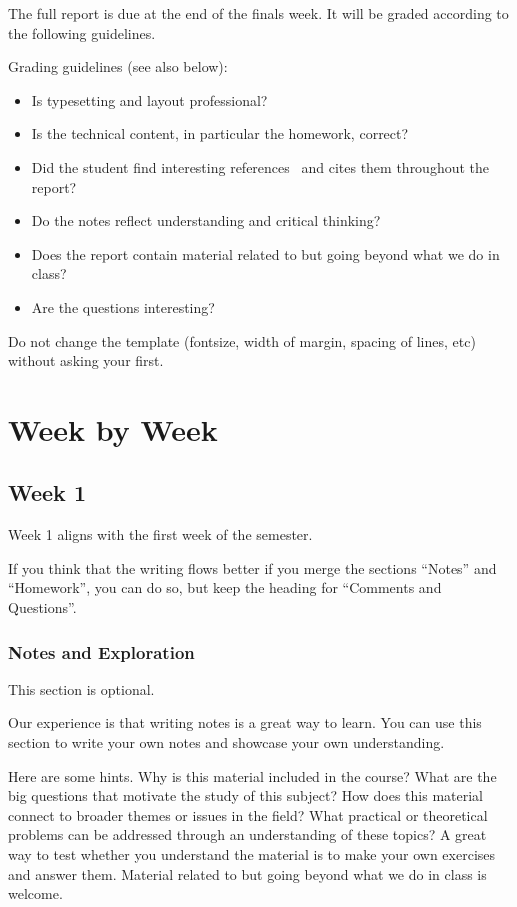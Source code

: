 \documentclass{article}
\theoremstyle{theorem}
\theoremstyle{definition}
\theoremstyle{remark}
\begin{document}
The full report is due at the end of the finals week. It will be graded according to the following guidelines.

Grading  guidelines (see also below):
\begin{itemize}
\item Is typesetting and layout professional? 
\item Is the technical content, in particular the homework, correct?
\item Did the student find interesting references~\cite{bla} and cites them throughout the report?
\item Do the notes reflect understanding and critical thinking?
\item Does the report contain material related to but going beyond what we do in class?
\item Are the questions interesting?
\end{itemize}

Do not change the template (fontsize, width of margin, spacing of lines, etc) without asking your first.

\section{Week by Week}\label{homework}

\subsection{Week 1}

Week 1 aligns with the first week of the semester. 

If you think that the writing flows better if you merge the sections ``Notes'' and ``Homework'', you can do so, but keep the heading for ``Comments and Questions''.

\subsubsection{Notes and Exploration}

This section is optional. 

Our experience is that writing notes is a great way to learn. You can use this section to write your own notes and showcase your own understanding. 

Here are some hints. Why is this material included in the course? What are the big questions that motivate the study of this subject? How does this material connect to broader themes or issues in the field? What practical or theoretical problems can be addressed through an understanding of these topics? A great way to test whether you understand the material is to make your own exercises and answer them. Material related to but going beyond what we do in class is welcome.
\end{document}
